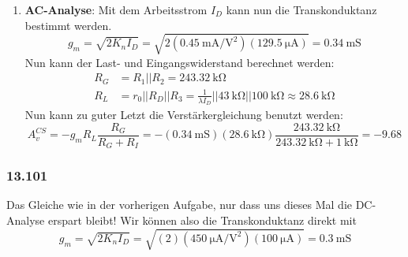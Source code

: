 \documentclass[11pt,a4paper,titlepage]{article}
\begin{document}
\begin{enumerate}
	\item \textbf{AC-Analyse}: Mit dem Arbeitsstrom $I_D$ kann nun die Transkonduktanz bestimmt werden.
	\[ g_m=\sqrt{2K_nI_D} = \sqrt{2(\SI{0.45}{\milli\ampere\per\square\volt})(\SI{129.5}{\micro\ampere})} = \SI{0.34}{\milli\siemens} \]
	Nun kann der Last- und Eingangswiderstand berechnet werden:
	\begin{equation}
	\begin{aligned}
	R_G &= R_1||R_2 = \SI{243.32}{\kilo\ohm}\\
	R_L &= r_0||R_D||R_3 = \frac{1}{\lambda I_D} || \SI{43}{\kilo\ohm} || \SI{100}{\kilo\ohm} \approx \SI{28.6}{\kilo\ohm}
	\end{aligned}
	\end{equation}
	Nun kann zu guter Letzt die Verstärkergleichung benutzt werden:
	\[ A_v^{CS} = -g_mR_L\frac{R_G}{R_G+R_I} = -(\SI{0.34}{\milli\siemens})(\SI{28.6}{\kilo\ohm}) \frac{\SI{243.32}{\kilo\ohm}}{\SI{243.32}{\kilo\ohm} + \SI{1}{\kilo\ohm}} = -9.68 \]
	
\end{enumerate}

\subsubsection*{13.101}
Das Gleiche wie in der vorherigen Aufgabe, nur dass uns dieses Mal die DC-Analyse erspart bleibt! Wir können also die Transkonduktanz direkt mit
\[ g_m = \sqrt{2K_nI_D} = \sqrt{(2)(\SI{450}{\micro\ampere\per\square\volt})(\SI{100}{\micro\ampere})} = \SI{0.3}{\milli\siemens} \] 
\end{document}
